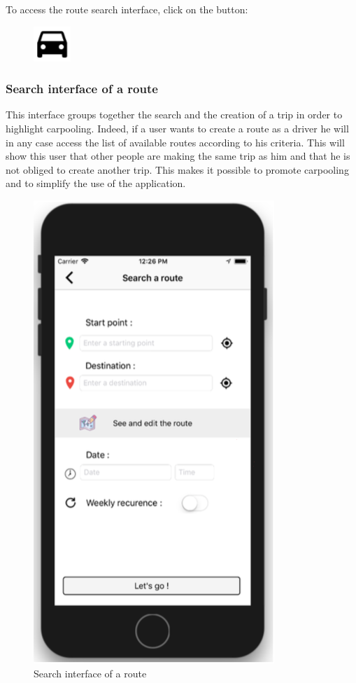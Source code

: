To access the route search interface, click on the button:
\begin{figure}[h!]
\begin{center}
\includegraphics[scale = 0.3]{diagrams/SearchButton.png} 
\end{center}
\end{figure}

\subsubsection{Search interface of a route}

This interface groups together the search and the creation of a trip in order to highlight carpooling. Indeed, if a user wants to create a route as a driver he will in any case access the list of available routes according to his criteria. This will show this user that other people are making the same trip as him and that he is not obliged to create another trip. This makes it possible to promote carpooling and to simplify the use of the application.

\begin{figure}[h!]
\begin{center}
\includegraphics[scale = 0.3]{diagrams/SearchInterfaceRoute.png} 
\end{center}
\caption{Search interface of a route}
\end{figure}

